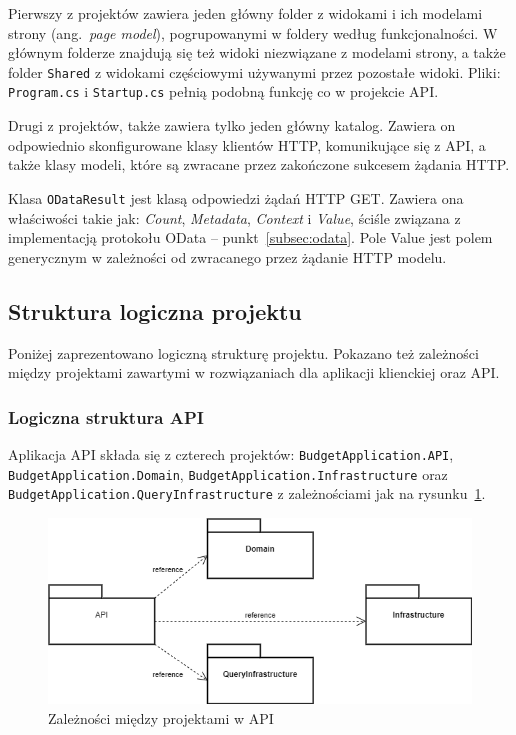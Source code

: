 Pierwszy z projektów zawiera jeden główny folder z widokami i ich modelami strony (ang.~\emph{page model}), pogrupowanymi w foldery według funkcjonalności. W głównym folderze znajdują się też widoki niezwiązane z modelami strony, a także folder \texttt{Shared} z widokami częściowymi używanymi przez pozostałe widoki. Pliki: \texttt{Program.cs} i \texttt{Startup.cs} pełnią podobną funkcję co w projekcie API.

Drugi z projektów, także zawiera tylko jeden główny katalog. Zawiera on odpowiednio skonfigurowane klasy klientów HTTP, komunikujące się z API, a także klasy modeli, które są zwracane przez zakończone sukcesem żądania HTTP.

Klasa \texttt{ODataResult} jest klasą odpowiedzi żądań HTTP GET. Zawiera ona właściwości takie jak: \emph{Count}, \emph{Metadata}, \emph{Context} i \emph{Value}, ściśle związana z implementacją protokołu OData -- punkt~\ref{subsec:odata}. Pole Value jest polem generycznym w zależności od zwracanego przez żądanie HTTP modelu. 


\subsection{Struktura logiczna projektu}
\label{sec:struktura-logiczna-projektu}
Poniżej zaprezentowano logiczną strukturę projektu. Pokazano też zależności między projektami zawartymi w rozwiązaniach dla aplikacji klienckiej oraz API.

\subsubsection{Logiczna struktura API}
Aplikacja API składa się z czterech projektów: \texttt{BudgetApplication.API}, \texttt{BudgetApplication.Domain}, \texttt{BudgetApplication.Infrastructure} oraz \texttt{BudgetApplication.QueryInfrastructure} z zależnościami jak na rysunku~\ref{fig:api-arch}. 
\begin{figure}[ht]
	\centering
	\includegraphics[scale=.55]{rys04/api-arch.png}
	\caption{Zależności między projektami w API}
	\label{fig:api-arch}
\end{figure}

